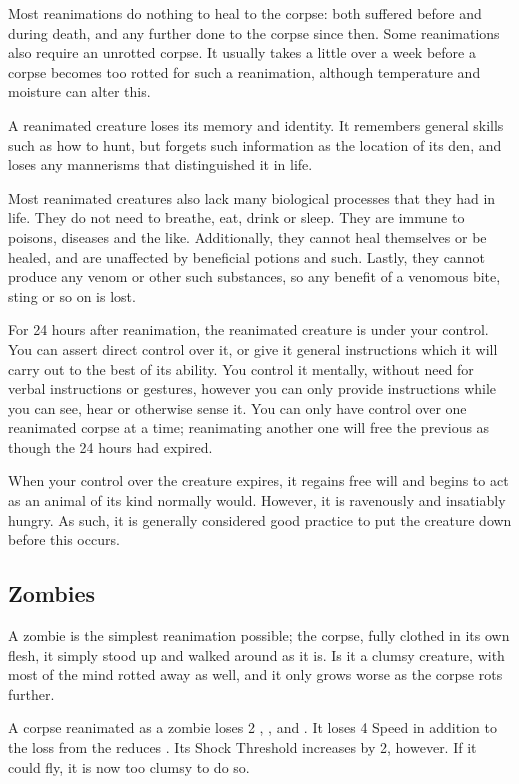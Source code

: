 Most reanimations do nothing to heal  to the corpse: both  suffered before and during death, and any further  done to the corpse since then.
Some reanimations also require an unrotted corpse.
It usually takes a little over a week before a corpse becomes too rotted for such a reanimation, although temperature and moisture can alter this.

A reanimated creature loses its memory and identity.
It remembers general skills such as how to hunt, but forgets such information as the location of its den, and loses any mannerisms that distinguished it in life.

Most reanimated creatures also lack many biological processes that they had in life.
They do not need to breathe, eat, drink or sleep.
They are immune to poisons, diseases and the like.
Additionally, they cannot heal themselves or be healed, and are unaffected by beneficial potions and such.
Lastly, they cannot produce any venom or other such substances, so any benefit of a venomous bite, sting or so on is lost.

For 24 hours after reanimation, the reanimated creature is under your control.
You can assert direct control over it, or give it general instructions which it will carry out to the best of its ability.
You control it mentally, without need for verbal instructions or gestures, however you can only provide instructions while you can see, hear or otherwise sense it.
You can only have control over one reanimated corpse at a time; reanimating another one will free the previous as though the 24 hours had expired.

When your control over the creature expires, it regains free will and begins to act as an animal of its kind normally would.
However, it is ravenously and insatiably hungry.
As such, it is generally considered good practice to put the creature down before this occurs.

\subsection{Zombies}

A zombie is the simplest reanimation possible; the corpse, fully clothed in its own flesh, it simply stood up and walked around as it is.
Is it a clumsy creature, with most of the mind rotted away as well, and it only grows worse as the corpse rots further.

A corpse reanimated as a zombie loses 2 , ,  and .
It loses 4 Speed in addition to the loss from the reduces .
Its Shock Threshold increases by 2, however.
If it could fly, it is now too clumsy to do so.

